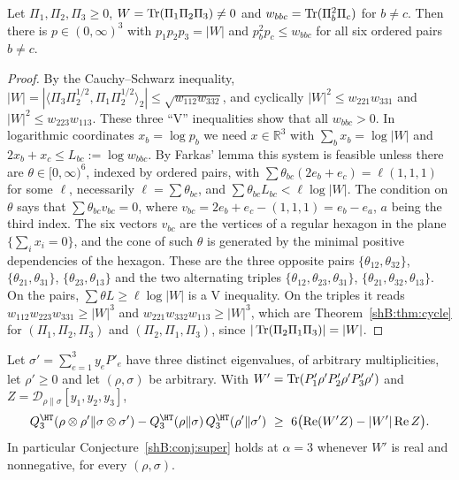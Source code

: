 \begin{lemma}\label{shB:lem:domination}
Let $\Pi_1,\Pi_2,\Pi_3\ge0$, $W=\operatorname{Tr}(\Pi_1\Pi_2\Pi_3)\ne0$ and $w_{bbc}=\operatorname{Tr}(\Pi_b^2\Pi_c)$ for $b\ne c$. Then there is $p\in(0,\infty)^3$ with $p_1p_2p_3=|W|$ and $p_b^2p_c\le w_{bbc}$ for all six ordered pairs $b\ne c$.
\end{lemma}

\begin{proof}
By the Cauchy--Schwarz inequality, $|W|=|\langle\Pi_3\Pi_2^{1/2},\Pi_1\Pi_2^{1/2}\rangle_2|\le\sqrt{w_{112}w_{332}}$, and cyclically $|W|^2\le w_{221}w_{331}$ and $|W|^2\le w_{223}w_{113}$. These three ``V'' inequalities show that all $w_{bbc}>0$. In logarithmic coordinates $x_b=\log p_b$ we need $x\in\mathbb R^3$ with $\sum_bx_b=\log|W|$ and $2x_b+x_c\le L_{bc}:=\log w_{bbc}$. By Farkas' lemma this system is feasible unless there are $\theta\in[0,\infty)^6$, indexed by ordered pairs, with $\sum\theta_{bc}(2e_b+e_c)=\ell(1,1,1)$ for some $\ell$, necessarily $\ell=\sum\theta_{bc}$, and $\sum\theta_{bc}L_{bc}<\ell\log|W|$. The condition on $\theta$ says that $\sum\theta_{bc}v_{bc}=0$, where $v_{bc}=2e_b+e_c-(1,1,1)=e_b-e_a$, $a$ being the third index. The six vectors $v_{bc}$ are the vertices of a regular hexagon in the plane $\{\sum_i x_i=0\}$, and the cone of such $\theta$ is generated by the minimal positive dependencies of the hexagon. These are the three opposite pairs $\{\theta_{12},\theta_{32}\}$, $\{\theta_{21},\theta_{31}\}$, $\{\theta_{23},\theta_{13}\}$ and the two alternating triples $\{\theta_{12},\theta_{23},\theta_{31}\}$, $\{\theta_{21},\theta_{32},\theta_{13}\}$. On the pairs, $\sum\theta L\ge\ell\log|W|$ is a V inequality. On the triples it reads $w_{112}w_{223}w_{331}\ge|W|^3$ and $w_{221}w_{332}w_{113}\ge|W|^3$, which are Theorem~\ref{shB:thm:cycle} for $(\Pi_1,\Pi_2,\Pi_3)$ and $(\Pi_2,\Pi_1,\Pi_3)$, since $|\operatorname{Tr}(\Pi_2\Pi_1\Pi_3)|=|W|$.
\end{proof}

\begin{corollary}\label{shB:cor:threelevel}
Let $\sigma'=\sum_{e=1}^3y_eP'_e$ have three distinct eigenvalues, of arbitrary multiplicities, let $\rho'\ge0$ and let $(\rho,\sigma)$ be arbitrary. With $W'=\operatorname{Tr}(P'_1\rho'P'_2\rho'P'_3\rho')$ and $Z=\mathcal D_{\rho\|\sigma}[y_1,y_2,y_3]$,
\[
Q^\HT_3(\rho\otimes\rho'\|\sigma\otimes\sigma')-Q^\HT_3(\rho\|\sigma)\,Q^\HT_3(\rho'\|\sigma')\ \ge\ 6\big(\mathrm{Re}(W'Z)-|W'|\,\mathrm{Re}\,Z\big).
\]
In particular Conjecture~\ref{shB:conj:super} holds at $\alpha=3$ whenever $W'$ is real and nonnegative, for every $(\rho,\sigma)$.
\end{corollary}

